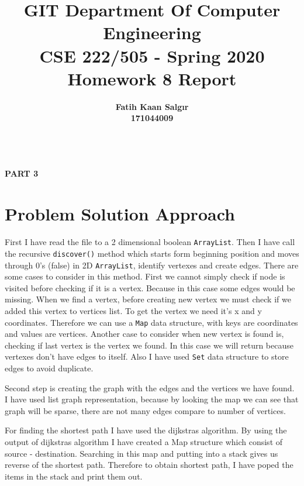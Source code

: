 \documentclass[a4paper]{article}
\title{\textbf{GIT Department Of Computer Engineering\\ 
CSE 222/505 - Spring 2020\\
Homework 8 Report \vspace{1in}}}
\author{\textbf{Fatih Kaan Salgır} \\ 
\textbf{171044009}}
\date{}
\begin{document}
\begin{large}

  \maketitle

  \newpage

  \begin{center}
    \textbf{ \\
      \vspace{3cm}
      \Huge{PART 3}
    }
  \end{center}

  \newpage

  \section{Problem Solution Approach}

	First I have read the file to a 2 dimensional boolean \texttt{ArrayList}. Then I have call the recursive \texttt{discover()} method which starts form beginning position and moves through 0's (false) in 2D \texttt{ArrayList}, identify vertexes and create edges. There are some cases to consider in this method. First we cannot simply check if node is visited before checking if it is a vertex. Because in this case some edges would be missing. When we find a vertex, before creating new vertex we must check if we added this vertex to vertices list. To get the vertex we need it's x and y coordinates. Therefore we can use a \texttt{Map} data structure, with keys are coordinates and values are vertices. Another case to consider when new vertex is found is, checking if last vertex is the vertex we found. In this case we will return because vertexes don't have edges to itself. Also I have used \texttt{Set} data structure to store edges to avoid duplicate. 
  \vspace{1em}

	Second step is creating the graph with the edges and the vertices we have found. I have used list graph representation, because by looking the map we can see that graph will be sparse, there are not many edges compare to number of vertices. 
  \vspace{1em}

	For finding the shortest path I have used the dijkstras algorithm. By using the output of dijkstras algorithm I have created a Map structure which consist of source - destination. Searching in this map and putting into a stack gives us reverse of the shortest path. Therefore to obtain shortest path, I have poped the items in the stack and print them out.


\end{large}
\end{document}
